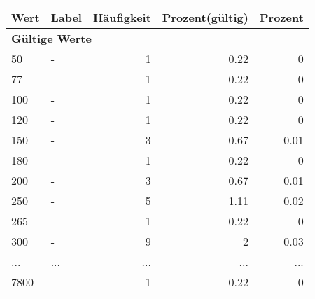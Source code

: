      \begin{longtable}{lXrrr}
     \toprule
     \textbf{Wert} & \textbf{Label} & \textbf{Häufigkeit} & \textbf{Prozent(gültig)} & \textbf{Prozent} \\
     \endhead
     \midrule
     \multicolumn{5}{l}{\textbf{Gültige Werte}}\\
        50 & \multicolumn{1}{X}{-} & %
          \num{1} &
          \num[round-mode=places,round-precision=2]{0.22} &
          \num[round-mode=places,round-precision=2]{0} \\
        77 & \multicolumn{1}{X}{-} & %
          \num{1} &
          \num[round-mode=places,round-precision=2]{0.22} &
          \num[round-mode=places,round-precision=2]{0} \\
        100 & \multicolumn{1}{X}{-} & %
          \num{1} &
          \num[round-mode=places,round-precision=2]{0.22} &
          \num[round-mode=places,round-precision=2]{0} \\
        120 & \multicolumn{1}{X}{-} & %
          \num{1} &
          \num[round-mode=places,round-precision=2]{0.22} &
          \num[round-mode=places,round-precision=2]{0} \\
        150 & \multicolumn{1}{X}{-} & %
          \num{3} &
          \num[round-mode=places,round-precision=2]{0.67} &
          \num[round-mode=places,round-precision=2]{0.01} \\
        180 & \multicolumn{1}{X}{-} & %
          \num{1} &
          \num[round-mode=places,round-precision=2]{0.22} &
          \num[round-mode=places,round-precision=2]{0} \\
        200 & \multicolumn{1}{X}{-} & %
          \num{3} &
          \num[round-mode=places,round-precision=2]{0.67} &
          \num[round-mode=places,round-precision=2]{0.01} \\
        250 & \multicolumn{1}{X}{-} & %
          \num{5} &
          \num[round-mode=places,round-precision=2]{1.11} &
          \num[round-mode=places,round-precision=2]{0.02} \\
        265 & \multicolumn{1}{X}{-} & %
          \num{1} &
          \num[round-mode=places,round-precision=2]{0.22} &
          \num[round-mode=places,round-precision=2]{0} \\
        300 & \multicolumn{1}{X}{-} & %
          \num{9} &
          \num[round-mode=places,round-precision=2]{2} &
          \num[round-mode=places,round-precision=2]{0.03} \\
       ... & ... & ... & ... & ... \\
        7800 & \multicolumn{1}{X}{-} & %
          \num{1} &
          \num[round-mode=places,round-precision=2]{0.22} &
          \num[round-mode=places,round-precision=2]{0} \\


\end{longtable}
